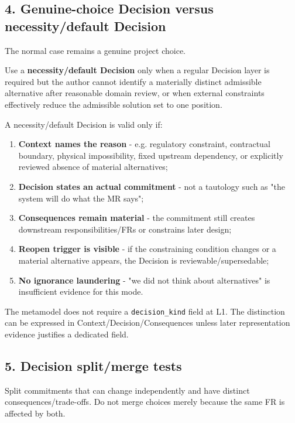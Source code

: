 \documentclass[
  10pt,
]{article}
\providecommand{\tightlist}{%
  \setlength{\itemsep}{0pt}\setlength{\parskip}{0pt}}
\begin{document}
\subsection{4. Genuine-choice Decision versus necessity/default
Decision}\label{4-genuine-choice-decision-versus-necessitydefault-decision}

The normal case remains a genuine project choice.

Use a \textbf{necessity/default Decision} only when a regular Decision
layer is required but the author cannot identify a materially distinct
admissible alternative after reasonable domain review, or when external
constraints effectively reduce the admissible solution set to one
position.

A necessity/default Decision is valid only if:

\begin{enumerate}
\def\labelenumi{\arabic{enumi}.}
\tightlist
\item
  \textbf{Context names the reason} - e.g. regulatory constraint,
  contractual boundary, physical impossibility, fixed upstream
  dependency, or explicitly reviewed absence of material alternatives;
\item
  \textbf{Decision states an actual commitment} - not a tautology such
  as "the system will do what the MR says";
\item
  \textbf{Consequences remain material} - the commitment still creates
  downstream responsibilities/FRs or constrains later design;
\item
  \textbf{Reopen trigger is visible} - if the constraining condition
  changes or a material alternative appears, the Decision is
  reviewable/supersedable;
\item
  \textbf{No ignorance laundering} - "we did not think about
  alternatives" is insufficient evidence for this mode.
\end{enumerate}

The metamodel does not require a \texttt{decision\_kind} field at L1.
The distinction can be expressed in Context/Decision/Consequences unless
later representation evidence justifies a dedicated field.

\subsection{5. Decision split/merge
tests}\label{5-decision-splitmerge-tests}

Split commitments that can change independently and have distinct
consequences/trade-offs. Do not merge choices merely because the same FR
is affected by both.
\end{document}
